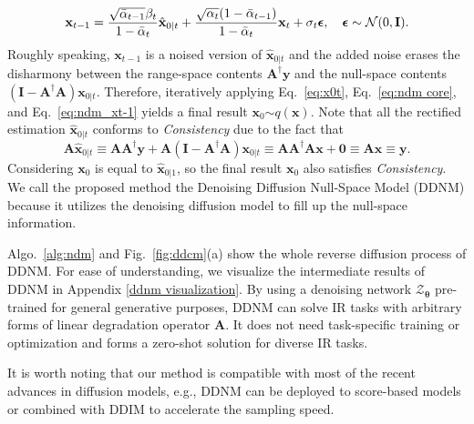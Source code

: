 \documentclass{article} \usepackage{iclr2023_conference,times}
\begin{document}
\begin{equation}
   \mathbf{x}_{t-1} = \frac{\sqrt{\Bar{\alpha}_{t-1}}\beta_{t}}{1-\Bar{\alpha}_{t}}\hat{\mathbf{x}}_{0|t}+ \frac{\sqrt{\alpha_{t}}(1-\Bar{\alpha}_{t-1})}{1-\Bar{\alpha}_{t}}\mathbf{x}_{t} + \sigma_{t}\boldsymbol{\epsilon}, \quad \boldsymbol{\epsilon}\sim \mathcal{N}(0,\mathbf{I}).
    \label{eq:ndm_xt-1}
\end{equation}
Roughly speaking, $\mathbf{x}_{t-1}$ is a noised version of $\hat{\mathbf{x}}_{0|t}$ and the added noise erases the disharmony between the range-space contents $\mathbf{A}^{\dagger}\mathbf{y}$ and the null-space contents $(\mathbf{I} - \mathbf{A^{\dagger}}\mathbf{A})\mathbf{x}_{0|t}$. Therefore, iteratively applying Eq.~\ref{eq:x0t}, Eq.~\ref{eq:ndm core}, and Eq.~\ref{eq:ndm_xt-1} yields a final result $\mathbf{x}_{0}$$\sim$$ q(\mathbf{x})$. Note that all the rectified estimation $\hat{\mathbf{x}}_{0|t}$ conforms to \textit{Consistency} due to the fact that
\begin{equation}
    \mathbf{A}\hat{\mathbf{x}}_{0|t}\equiv\mathbf{A}\mathbf{A^{\dagger}}\mathbf{y} + \mathbf{A}(\mathbf{I} - \mathbf{A^{\dagger}}\mathbf{A})\mathbf{x}_{0|t}
    \equiv \mathbf{A}\mathbf{A}^{\dagger}\mathbf{A}\mathbf{x} + \mathbf{0} \equiv \mathbf{A}\mathbf{x} \equiv \mathbf{y}.
    \label{eq:rnd consistency}
\end{equation} 
Considering $\mathbf{x}_{0}$ is equal to $\hat{\mathbf{x}}_{0|1}$, so the final result $\mathbf{x}_{0}$ also satisfies \textit{Consistency}. We call the proposed method the Denoising Diffusion Null-Space Model (DDNM) because it utilizes the denoising diffusion model to fill up the null-space information.

Algo.~\ref{alg:ndm} and Fig.~\ref{fig:ddcm}(a) show the whole reverse diffusion process of DDNM. For ease of understanding, we visualize the intermediate results of DDNM in Appendix \ref{ddnm visualization}. By using a denoising network $\mathcal{Z}_{\boldsymbol{\theta}}$ pre-trained for general generative purposes, DDNM can solve IR tasks with arbitrary forms of linear degradation operator $\mathbf{A}$. It does not need task-specific training or optimization and forms a zero-shot solution for diverse IR tasks. 

It is worth noting that our method is compatible with most of the recent advances in diffusion models, e.g., DDNM can be deployed to score-based models \citep{song2019generative,song2020score} or combined with DDIM \citep{song2021denoising} to accelerate the sampling speed.
\end{document}
